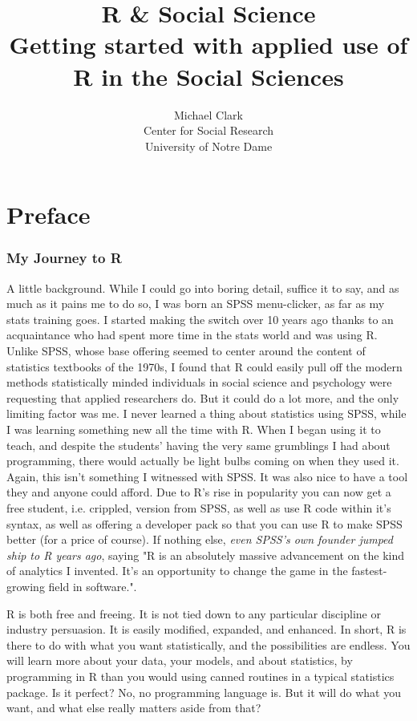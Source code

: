 \documentclass[english,nohyper,titlepage]{tufte-handout}\usepackage[]{graphicx}\usepackage[]{color}
\title{\Huge R \& Social Science \\ \noindent \small Getting started with applied use of R in the Social Sciences}
\author{{\small Michael Clark\\
         \noindent Center for Social Research\\
         \noindent University of Notre Dame\\}}
\begin{document}
\maketitle

\pagebreak

\tableofcontents

\pagebreak

\part{Preface}
\section{My Journey to R}


A little background.  While I could go into boring detail, suffice it to say, and as much as it pains me to do so, I was born an SPSS menu-clicker, as far as my stats training goes.  I started making the switch over 10 years ago thanks to an acquaintance who had spent more time in the stats world and was using R.  Unlike SPSS, whose base offering seemed to center around  the content of statistics textbooks of the 1970s, I found that R could easily pull off the modern methods statistically minded individuals in social science and psychology were requesting that applied researchers do.  But it could do a lot more, and the only limiting factor was me.  I never learned a thing about statistics using SPSS, while I was learning something new all the time with R. When I began using it to teach, and despite the students' having the very same grumblings I had about programming, there would actually be light bulbs coming on when they used it.  Again, this isn't something I witnessed with SPSS.  It was also nice to have a tool they and anyone could afford.  Due to R's rise in popularity you can now get a free student, i.e. crippled, version from SPSS, as well as use R code within it's syntax, as well as offering a developer pack so that you can use R to make SPSS better (for a price of course).  If nothing else, \emph{even SPSS's own founder jumped ship to R years ago}, saying "R is an absolutely massive advancement on the kind of analytics I invented. It's an opportunity to change the game in the fastest-growing field in software.".  

R is both free and freeing.  It is not tied down to any particular discipline or industry persuasion.  It is easily modified, expanded, and enhanced.  In short, R is there to do with what you want statistically, and the possibilities are endless.  You will learn more about your data, your models, and about statistics, by programming in R than you would using canned routines in a typical statistics package. Is it perfect? No, no programming language is.  But it will do what you want, and what else really matters aside from that?
\end{document}
